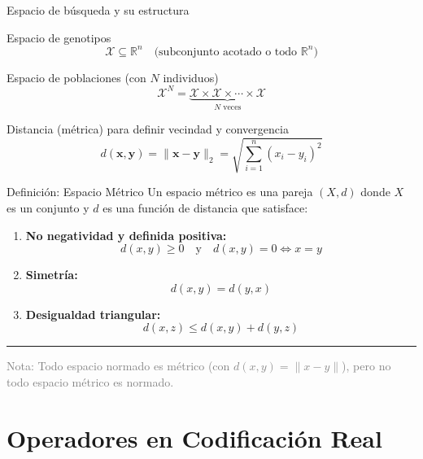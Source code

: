 \documentclass[10pt, aspectratio=169]{beamer}
\begin{document}
\begin{frame}{Espacio de búsqueda y su estructura}
\begin{block}{Espacio de genotipos}
\[
\mathcal{X} \subseteq \mathbb{R}^n \quad \text{(subconjunto acotado o todo $\mathbb{R}^n$)}
\]
\end{block}

\begin{block}{Espacio de poblaciones (con $N$ individuos)}
\[
\mathcal{X}^N = \underbrace{\mathcal{X} \times \mathcal{X} \times \cdots \times \mathcal{X}}_{N \text{ veces}}
\]
\end{block}

\begin{block}{Distancia (métrica) para definir vecindad y convergencia}
\[
d(\mathbf{x}, \mathbf{y}) = \|\mathbf{x} - \mathbf{y}\|_2 = \sqrt{\sum_{i=1}^n (x_i - y_i)^2}
\]
\end{block}
\end{frame}

\begin{frame}{Definición: Espacio Métrico}
Un espacio métrico es una pareja $(X, d)$ donde $X$ es un conjunto y $d$ es una función de distancia que satisface:

\begin{enumerate}
    \item \textbf{No negatividad y definida positiva:} 
    \[
    d(x,y) \ge 0 \quad \text{y} \quad d(x,y)=0 \iff x=y
    \]
    \item \textbf{Simetría:} 
    \[
    d(x,y) = d(y,x)
    \]
    \item \textbf{Desigualdad triangular:} 
    \[
    d(x,z) \le d(x,y) + d(y,z)
    \]
\end{enumerate}

\vspace{2mm}
\rule{\textwidth}{0.5pt}
\vspace{2mm}
\footnotesize \textcolor{gray}{Nota: Todo espacio normado es métrico (con $d(x,y)=\|x-y\|$), pero no todo espacio métrico es normado.}
\end{frame}

\section{Operadores en Codificación Real}
\end{document}
